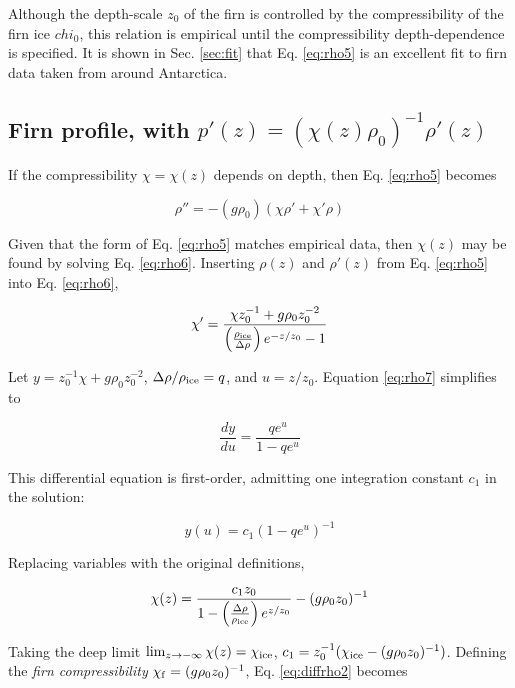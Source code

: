\documentclass[12pt]{article}
\begin{document}
Although the depth-scale $z_0$ of the firn is controlled by the compressibility of the firn ice $chi_0$, this relation is empirical until the compressibility depth-dependence is specified.  It is shown in Sec. \ref{sec:fit} that Eq. \ref{eq:rho5} is an excellent fit to firn data taken from around Antarctica.

\subsection{Firn profile, with $p'(z) = (\chi(z)\rho_0)^{-1} \rho'(z)$}
\label{sec:firn2}

If the compressibility $\chi=\chi(z)$ depends on depth, then Eq. \ref{eq:rho5} becomes

\begin{equation}
\rho'' = -(g\rho_0)(\chi\rho'+\chi'\rho)
\label{eq:rho6}
\end{equation}

Given that the form of Eq. \ref{eq:rho5} matches empirical data, then $\chi(z)$ may be found by solving Eq. \ref{eq:rho6}.  Inserting $\rho(z)$ and $\rho'(z)$ from Eq. \ref{eq:rho5} into Eq. \ref{eq:rho6},

\begin{equation}
\chi' = \frac{\chi z_0^{-1} + g\rho_0z_0^{-2}}{\left(\frac{\rho_{\rm ice}}{\Delta\rho}\right)e^{-z/z_0} - 1}
\label{eq:rho7}
\end{equation}

Let $y = z_0^{-1} \chi + g\rho_0 z_0^{-2}$, $\Delta\rho/\rho_{\rm ice} = q$, and $u = z/z_0$.  Equation \ref{eq:rho7} simplifies to

\begin{equation}
\frac{dy}{du} = \frac{q e^{u}}{1-q e^{u}}
\label{eq:diffrho1}
\end{equation}

This differential equation is first-order, admitting one integration constant $c_1$ in the solution:

\begin{equation}
y(u) = c_1(1-qe^u)^{-1}
\label{eq:diffrho2}
\end{equation}

Replacing variables with the original definitions,

\begin{equation}
\chi(z) = \frac{c_1z_0}{1-\left(\frac{\Delta\rho}{\rho_{\rm ice}}\right)e^{z/z_0}} - (g\rho_0z_0)^{-1}
\end{equation}

Taking the deep limit $\lim_{z\to-\infty} \chi(z) = \chi_{\rm ice}$, $c_1 = z_0^{-1}(\chi_{\rm ice}-(g\rho_0z_0)^{-1})$.  Defining the \textit{firn compressibility} $\chi_{\rm f} = (g\rho_0z_0)^{-1}$, Eq. \ref{eq:diffrho2} becomes
\end{document}
